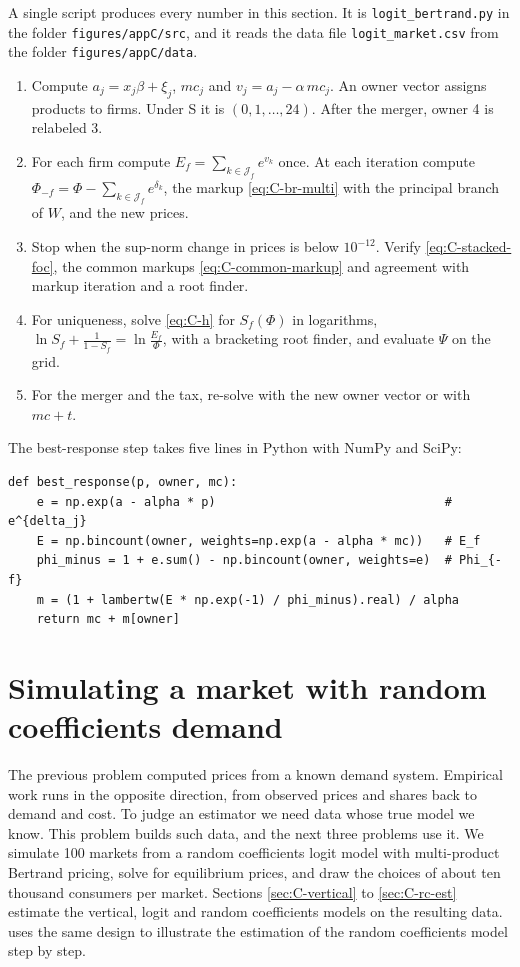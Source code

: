 A single script produces every number in this section. It is \texttt{logit\_bertrand.py} in the folder
\texttt{figures/appC/src}, and it reads the data file \texttt{logit\_market.csv} from the folder
\texttt{figures/appC/data}.
\begin{enumerate}
  \item Compute $a_j = x_j\beta + \xi_j$, $mc_j$ and $v_j = a_j - \alpha\,mc_j$. An owner vector assigns products to
  firms. Under S it is $(0, 1, \dots, 24)$. After the merger, owner 4 is relabeled 3.
  \item For each firm compute $E_f = \sum_{k \in \mathcal{J}_f}e^{v_k}$ once. At each iteration compute
  $\Phi_{-f} = \Phi - \sum_{k \in \mathcal{J}_f}e^{\delta_k}$, the markup \eqref{eq:C-br-multi} with the principal
  branch of $W$, and the new prices.
  \item Stop when the sup-norm change in prices is below $10^{-12}$. Verify \eqref{eq:C-stacked-foc}, the common
  markups \eqref{eq:C-common-markup} and agreement with markup iteration and a root finder.
  \item For uniqueness, solve \eqref{eq:C-h} for $S_f(\Phi)$ in logarithms, $\ln S_f + \frac{1}{1 - S_f} = \ln\frac{E_f}{\Phi}$,
  with a bracketing root finder, and evaluate $\Psi$ on the grid.
  \item For the merger and the tax, re-solve with the new owner vector or with $mc + t$.
\end{enumerate}
The best-response step takes five lines in Python with NumPy and SciPy:
\begin{verbatim}
def best_response(p, owner, mc):
    e = np.exp(a - alpha * p)                                # e^{delta_j}
    E = np.bincount(owner, weights=np.exp(a - alpha * mc))   # E_f
    phi_minus = 1 + e.sum() - np.bincount(owner, weights=e)  # Phi_{-f}
    m = (1 + lambertw(E * np.exp(-1) / phi_minus).real) / alpha
    return mc + m[owner]
\end{verbatim}

\section{Simulating a market with random coefficients demand}\label{sec:C-simulate}

The previous problem computed prices from a known demand system. Empirical work runs in the opposite direction,
from observed prices and shares back to demand and cost. To judge an estimator we need data whose true model we
know. This problem builds such data, and the next three problems use it. We simulate 100 markets
from a random coefficients logit model with multi-product Bertrand pricing, solve for equilibrium prices, and draw the
choices of about ten thousand consumers per market. Sections \ref{sec:C-vertical} to \ref{sec:C-rc-est} estimate the
vertical, logit and random coefficients models on the resulting data.  uses the same design to
illustrate the estimation of the random coefficients model step by step.

